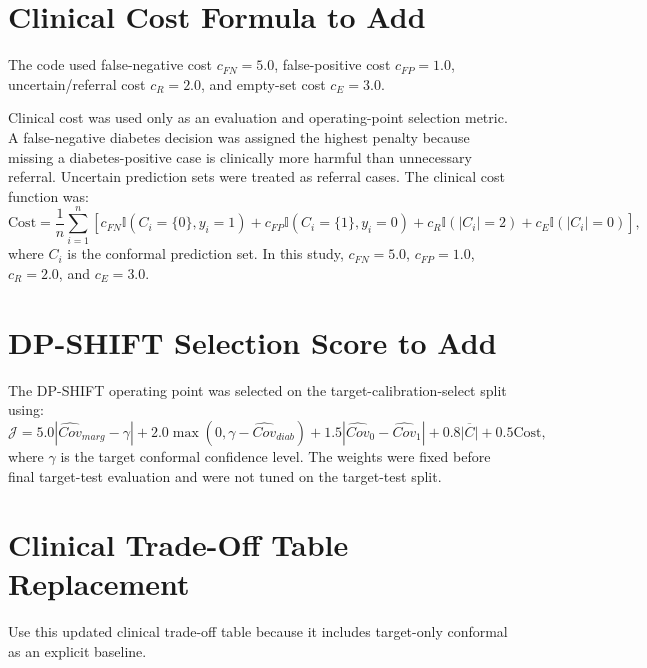 \documentclass[11pt]{article}
\begin{document}
\section{Clinical Cost Formula to Add}
The code used false-negative cost $c_{FN}=5.0$, false-positive cost $c_{FP}=1.0$, uncertain/referral cost $c_R=2.0$, and empty-set cost $c_E=3.0$.

Clinical cost was used only as an evaluation and operating-point selection metric. A false-negative diabetes decision was assigned the highest penalty because missing a diabetes-positive case is clinically more harmful than unnecessary referral. Uncertain prediction sets were treated as referral cases. The clinical cost function was:
\begin{equation}
\mathrm{Cost}=\frac{1}{n}\sum_{i=1}^{n}
\left[
c_{FN}\mathbb{I}(C_i=\{0\},y_i=1)
+c_{FP}\mathbb{I}(C_i=\{1\},y_i=0)
+c_{R}\mathbb{I}(|C_i|=2)
+c_E\mathbb{I}(|C_i|=0)
\right],
\end{equation}
where $C_i$ is the conformal prediction set. In this study, $c_{FN}=5.0$, $c_{FP}=1.0$, $c_R=2.0$, and $c_E=3.0$.

\section{DP-SHIFT Selection Score to Add}
The DP-SHIFT operating point was selected on the target-calibration-select split using:
\begin{equation}
\mathcal{J}
=
5.0|\widehat{Cov}_{marg}-\gamma|
+2.0\max(0,\gamma-\widehat{Cov}_{diab})
+1.5|\widehat{Cov}_{0}-\widehat{Cov}_{1}|
+0.8\overline{|C|}
+0.5\mathrm{Cost},
\end{equation}
where $\gamma$ is the target conformal confidence level. The weights were fixed before final target-test evaluation and were not tuned on the target-test split.

\section{Clinical Trade-Off Table Replacement}
Use this updated clinical trade-off table because it includes target-only conformal as an explicit baseline.
\end{document}
